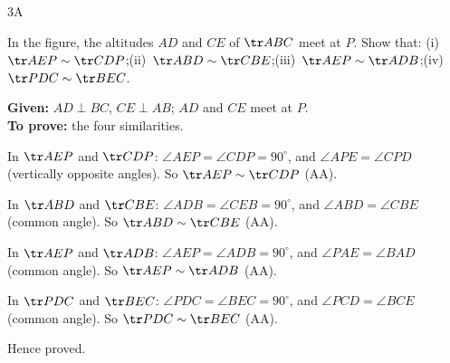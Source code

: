 \begin{exercise}{3A}
\item In the figure, the altitudes $AD$ and $CE$ of $\tr ABC$ meet at $P$. Show that:
(i)~$\tr AEP\sim\tr CDP$;\quad (ii)~$\tr ABD\sim\tr CBE$;\quad (iii)~$\tr AEP\sim\tr ADB$;\quad (iv)~$\tr PDC\sim\tr BEC$.
\begin{solution}
\textbf{Given:} $AD\perp BC$, $CE\perp AB$; $AD$ and $CE$ meet at $P$.\\
\textbf{To prove:} the four similarities.
\begin{steps}
  \item[(i)] In $\tr AEP$ and $\tr CDP$: $\angle AEP=\angle CDP=90^\circ$, and $\angle APE=\angle CPD$ (vertically opposite angles). So $\tr AEP\sim\tr CDP$ (AA).
  \item[(ii)] In $\tr ABD$ and $\tr CBE$: $\angle ADB=\angle CEB=90^\circ$, and $\angle ABD=\angle CBE$ (common angle). So $\tr ABD\sim\tr CBE$ (AA).
  \item[(iii)] In $\tr AEP$ and $\tr ADB$: $\angle AEP=\angle ADB=90^\circ$, and $\angle PAE=\angle BAD$ (common angle). So $\tr AEP\sim\tr ADB$ (AA).
  \item[(iv)] In $\tr PDC$ and $\tr BEC$: $\angle PDC=\angle BEC=90^\circ$, and $\angle PCD=\angle BCE$ (common angle). So $\tr PDC\sim\tr BEC$ (AA).
\end{steps}
Hence proved.
\end{solution}


\end{exercise}
